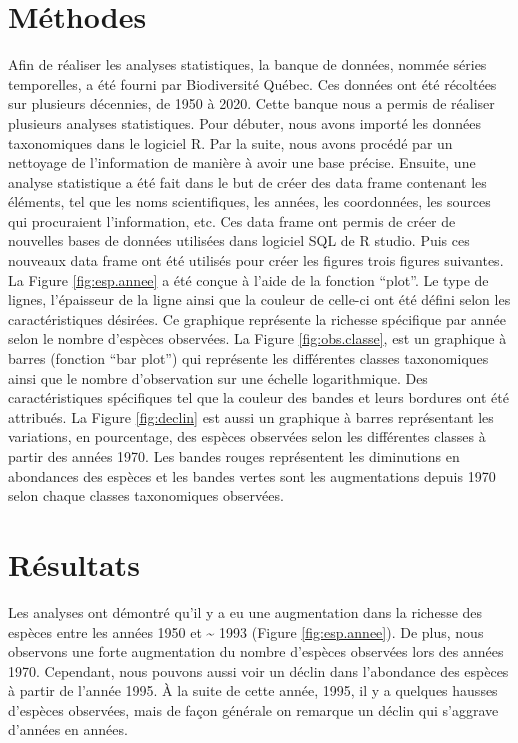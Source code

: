 \documentclass[9pt,twocolumn,twoside,]{pnas-new}
\begin{document}
\section{Méthodes}\label{muxe9thodes}

Afin de réaliser les analyses statistiques, la banque de données, nommée
séries temporelles, a été fourni par Biodiversité Québec. Ces données
ont été récoltées sur plusieurs décennies, de 1950 à 2020. Cette banque
nous a permis de réaliser plusieurs analyses statistiques. Pour débuter,
nous avons importé les données taxonomiques dans le logiciel R. Par la
suite, nous avons procédé par un nettoyage de l'information de manière à
avoir une base précise. Ensuite, une analyse statistique a été fait dans
le but de créer des data frame contenant les éléments, tel que les noms
scientifiques, les années, les coordonnées, les sources qui procuraient
l'information, etc. Ces data frame ont permis de créer de nouvelles
bases de données utilisées dans logiciel SQL de R studio. Puis ces
nouveaux data frame ont été utilisés pour créer les figures trois
figures suivantes. La Figure \ref{fig:esp.annee} a été conçue à l'aide
de la fonction ``plot''. Le type de lignes, l'épaisseur de la ligne
ainsi que la couleur de celle-ci ont été défini selon les
caractéristiques désirées. Ce graphique représente la richesse
spécifique par année selon le nombre d'espèces observées. La Figure
\ref{fig:obs.classe}, est un graphique à barres (fonction ``bar plot'')
qui représente les différentes classes taxonomiques ainsi que le nombre
d'observation sur une échelle logarithmique. Des caractéristiques
spécifiques tel que la couleur des bandes et leurs bordures ont été
attribués. La Figure \ref{fig:declin} est aussi un graphique à barres
représentant les variations, en pourcentage, des espèces observées selon
les différentes classes à partir des années 1970. Les bandes rouges
représentent les diminutions en abondances des espèces et les bandes
vertes sont les augmentations depuis 1970 selon chaque classes
taxonomiques observées.

\section{Résultats}\label{ruxe9sultats}

Les analyses ont démontré qu'il y a eu une augmentation dans la richesse
des espèces entre les années 1950 et \textasciitilde{} 1993 (Figure
\ref{fig:esp.annee}). De plus, nous observons une forte augmentation du
nombre d'espèces observées lors des années 1970. Cependant, nous pouvons
aussi voir un déclin dans l'abondance des espèces à partir de l'année
1995. À la suite de cette année, 1995, il y a quelques hausses d'espèces
observées, mais de façon générale on remarque un déclin qui s'aggrave
d'années en années.
\end{document}
